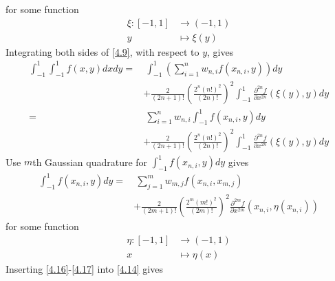 \documentclass[a4paper]{article}
\numberwithin{equation}{section}
\begin{document}
for some function
\begin{align}
\xi :\left[ { - 1,1} \right] &\to \left( { - 1,1} \right)\\
y &\mapsto \xi \left( y \right)
\end{align}
Integrating both sides of \eqref{4.9}, with respect to $y$, gives
\begin{align}
\int_{ - 1}^1 {\int_{ - 1}^1 {f\left( {x,y} \right)dx} dy}  =&\ \int_{ - 1}^1 {\left( {\sum\limits_{i = 1}^n {{w_{n,i}}f\left( {{x_{n,i}},y} \right)} } \right)dy} \\
 &+ \frac{2}{{\left( {2n + 1} \right)!}}{\left( {\frac{{{2^n}{{\left( {n!} \right)}^2}}}{{\left( {2n} \right)!}}} \right)^2}\int_{ - 1}^1 {\frac{{{\partial ^{2n}}f}}{{\partial {x^{2n}}}}\left( {\xi \left( y \right),y} \right)dy} \\
 =&\ \sum\limits_{i = 1}^n {{w_{n,i}}\int_{ - 1}^1 {f\left( {{x_{n,i}},y} \right)dy} }\label{4.14} \\
 &+ \frac{2}{{\left( {2n + 1} \right)!}}{\left( {\frac{{{2^n}{{\left( {n!} \right)}^2}}}{{\left( {2n} \right)!}}} \right)^2}\int_{ - 1}^1 {\frac{{{\partial ^{2n}}f}}{{\partial {x^{2n}}}}\left( {\xi \left( y \right),y} \right)dy} 
\end{align}
Use $m$th Gaussian quadrature for ${\int_{ - 1}^1 {f\left( {{x_{n,i}},y} \right)dy} }$ gives
\begin{align}
\label{4.16}
\int_{ - 1}^1 {f\left( {{x_{n,i}},y} \right)dy}  =&\ \sum\limits_{j = 1}^m {{w_{m,j}}f\left( {{x_{n,i}},{x_{m,j}}} \right)} \\
& + \frac{2}{{\left( {2m + 1} \right)!}}{\left( {\frac{{{2^m}{{\left( {m!} \right)}^2}}}{{\left( {2m} \right)!}}} \right)^2}\frac{{{\partial ^{2m}}f}}{{\partial {x^{2m}}}}\left( {{x_{n,i}},\eta \left( {{x_{n,i}}} \right)} \right)  \label{4.17}
\end{align}
for some function
\begin{align}
\eta :\left[ { - 1,1} \right] &\to \left( { - 1,1} \right)\\
x &\mapsto \eta \left( x \right)
\end{align}
Inserting \eqref{4.16}-\eqref{4.17} into \eqref{4.14} gives
\end{document}
